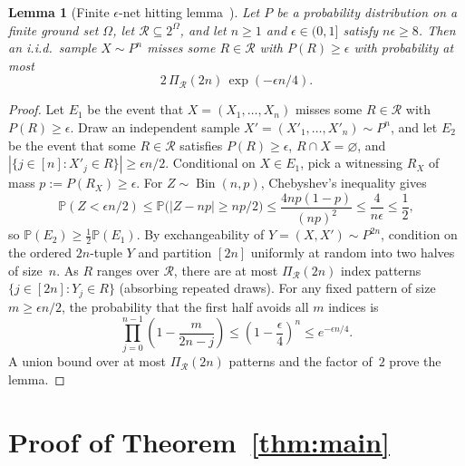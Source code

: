 \documentclass[11pt]{article}
\theoremstyle{plain}
\newtheorem{lemma}[theorem]{Lemma}
\theoremstyle{definition}
\theoremstyle{remark}
\DeclareMathOperator{\Bin}{Bin}
\begin{document}
\begin{lemma}[Finite $\epsilon$-net hitting lemma~\cite{HausslerWelzl1987}]\label{lem:hitting}
Let $P$ be a probability distribution on a finite ground set $\Omega$, let $\mathcal{R} \subseteq 2^\Omega$, and let $n \ge 1$ and $\epsilon \in (0,1]$ satisfy $n\epsilon \ge 8$. Then an i.i.d.\ sample $X \sim P^n$ misses some $R \in \mathcal{R}$ with $P(R) \ge \epsilon$ with probability at most
\[
2\,\Pi_{\mathcal{R}}(2n)\,\exp(-\epsilon n/4).
\]
\end{lemma}

\begin{proof}
Let $E_1$ be the event that $X = (X_1,\dots,X_n)$ misses some $R \in \mathcal{R}$ with $P(R) \ge \epsilon$. Draw an independent sample $X' = (X'_1,\dots,X'_n) \sim P^n$, and let $E_2$ be the event that some $R \in \mathcal{R}$ satisfies $P(R) \ge \epsilon$, $R \cap X = \varnothing$, and $|\{j \in [n] : X'_j \in R\}| \ge \epsilon n / 2$. Conditional on $X \in E_1$, pick a witnessing $R_X$ of mass $p := P(R_X) \ge \epsilon$. For $Z \sim \Bin(n,p)$, Chebyshev's inequality gives
\[
\mathbb{P}(Z < \epsilon n/2) \le \mathbb{P}\bigl(|Z - np| \ge np/2\bigr) \le \frac{4 np(1-p)}{(np)^2} \le \frac{4}{n\epsilon} \le \frac{1}{2},
\]
so $\mathbb{P}(E_2) \ge \frac{1}{2}\mathbb{P}(E_1)$. By exchangeability of $Y = (X, X') \sim P^{2n}$, condition on the ordered $2n$-tuple $Y$ and partition $[2n]$ uniformly at random into two halves of size~$n$. As $R$ ranges over $\mathcal{R}$, there are at most $\Pi_{\mathcal{R}}(2n)$ index patterns $\{j \in [2n] : Y_j \in R\}$ (absorbing repeated draws). For any fixed pattern of size $m \ge \epsilon n/2$, the probability that the first half avoids all $m$ indices is
\[
\prod_{j=0}^{n-1}\left(1 - \frac{m}{2n-j}\right) \le \left(1 - \frac{\epsilon}{4}\right)^n \le e^{-\epsilon n/4}.
\]
A union bound over at most $\Pi_{\mathcal{R}}(2n)$ patterns and the factor of~$2$ prove the lemma.
\end{proof}

\section{Proof of \texorpdfstring{Theorem~\ref{thm:main}}{Theorem 1}}
\end{document}
